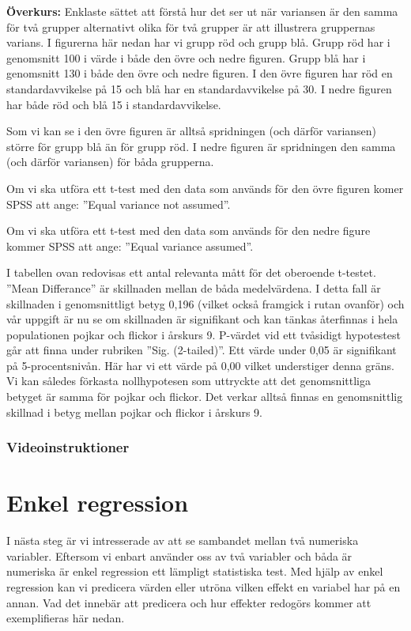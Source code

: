 \documentclass[
]{book}
\begin{document}
\textbf{Överkurs:} Enklaste sättet att förstå hur det ser ut när variansen är den samma för två grupper alternativt olika för två grupper är att illustrera gruppernas varians. I figurerna här nedan har vi grupp röd och grupp blå. Grupp röd har i genomsnitt 100 i värde i både den övre och nedre figuren. Grupp blå har i genomsnitt 130 i både den övre och nedre figuren. I den övre figuren har röd en standardavvikelse på 15 och blå har en standardavvikelse på 30. I nedre figuren har både röd och blå 15 i standardavvikelse.

Som vi kan se i den övre figuren är alltså spridningen (och därför variansen) större för grupp blå än för grupp röd. I nedre figuren är spridningen den samma (och därför variansen) för båda grupperna.

Om vi ska utföra ett t-test med den data som används för den övre figuren komer SPSS att ange: ''Equal variance not assumed''.

Om vi ska utföra ett t-test med den data som används för den nedre figure kommer SPSS att ange: ''Equal variance assumed''.

I tabellen ovan redovisas ett antal relevanta mått för det oberoende t-testet. ''Mean Differance'' är
skillnaden mellan de båda medelvärdena. I detta fall är skillnaden i genomsnittligt betyg 0,196 (vilket också framgick i rutan ovanför) och vår uppgift är nu se om skillnaden är signifikant och kan tänkas återfinnas i hela populationen pojkar och flickor i årskurs 9. P-värdet vid ett tvåsidigt hypotestest går att finna under rubriken ''Sig. (2-tailed)''. Ett värde under 0,05 är signifikant på 5-procentsnivån. Här har vi ett värde på 0,00 vilket understiger denna gräns. Vi kan således förkasta nollhypotesen som uttryckte att det genomsnittliga betyget är samma för pojkar och flickor. Det verkar alltså finnas en genomsnittlig skillnad i betyg mellan pojkar och flickor i årskurs 9.

\hypertarget{videoinstruktioner-9}{%
\subsection{Videoinstruktioner}\label{videoinstruktioner-9}}

\hypertarget{enkel-regression}{%
\chapter{Enkel regression}\label{enkel-regression}}

I nästa steg är vi intresserade av att se sambandet mellan två numeriska variabler. Eftersom vi enbart använder oss av två variabler och båda är numeriska är enkel regression ett lämpligt statistiska test. Med hjälp av enkel regression kan vi predicera värden eller utröna vilken effekt en variabel har på en annan. Vad det innebär att predicera och hur effekter redogörs kommer att exemplifieras här nedan.
\end{document}
